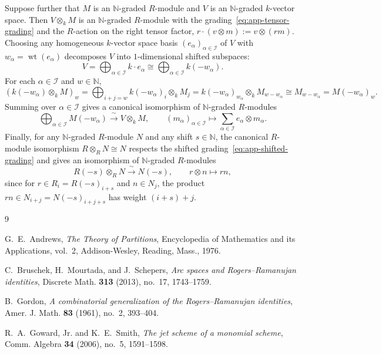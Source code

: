 \documentclass[a4paper, 12pt]{amsart}
\theoremstyle{remark}
\begin{document}
Suppose further that $M$ is an $\mathbb{N}$-graded $R$-module and $V$ is an $\mathbb{N}$-graded $k$-vector space.
Then $V \otimes_k M$ is an $\mathbb{N}$-graded $R$-module with the grading~\eqref{eq:app-tensor-grading} and the $R$-action on the right tensor factor,
$r \cdot (v \otimes m) := v \otimes (r m)$.
Choosing any homogeneous $k$-vector space basis $(e_\alpha)_{\alpha \in \mathcal{I}}$ of $V$ with $w_\alpha = \operatorname{wt}(e_\alpha)$ decomposes $V$ into $1$-dimensional shifted subspaces:
\begin{equation*}
  V = \bigoplus_{\alpha \in \mathcal{I}} k \cdot e_\alpha \cong \bigoplus_{\alpha \in \mathcal{I}} k(-w_\alpha).
\end{equation*}
For each $\alpha \in \mathcal{I}$ and $w \in \mathbb{N}$,
\begin{equation*}
  \left(k(-w_\alpha) \otimes_k M\right)_w
  = \bigoplus_{i + j = w} k(-w_\alpha)_i \otimes_k M_j
  = k(-w_\alpha)_{w_\alpha} \otimes_k M_{w - w_\alpha}
  \cong M_{w - w_\alpha}
  = M(-w_\alpha)_w.
\end{equation*}
Summing over $\alpha \in \mathcal{I}$ gives a canonical isomorphism of $\mathbb{N}$-graded $R$-modules
\begin{equation}
  \label{eq:app-shifted-sum-tensor}
  \bigoplus_{\alpha \in \mathcal{I}} M(-w_\alpha) \xrightarrow{\;\sim\;} V \otimes_k M, \qquad
  (m_\alpha)_{\alpha \in \mathcal{I}} \longmapsto \sum_{\alpha \in \mathcal{I}} e_\alpha \otimes m_\alpha.
\end{equation}
Finally,
for any $\mathbb{N}$-graded $R$-module $N$ and any shift $s \in \mathbb{N}$,
the canonical $R$-module isomorphism $R \otimes_R N \cong N$ respects the shifted grading~\eqref{eq:app-shifted-grading} and gives an isomorphism of $\mathbb{N}$-graded $R$-modules
\begin{equation}
  \label{eq:app-shifted-base-change}
  R(-s) \otimes_R N \xrightarrow{\;\sim\;} N(-s), \qquad
  r \otimes n \longmapsto r n,
\end{equation}
since for $r \in R_i = R(-s)_{i + s}$ and $n \in N_j$,
the product $r n \in N_{i + j} = N(-s)_{i + j + s}$ has weight $(i + s) + j$.

\begin{thebibliography}{9}

G.~E.~Andrews,
\newblock \emph{The Theory of Partitions},
\newblock Encyclopedia of Mathematics and its Applications, vol.~2, Addison-Wesley, Reading, Mass., 1976.

C.~Bruschek, H.~Mourtada, and J.~Schepers,
\newblock \emph{Arc spaces and {R}ogers--{R}amanujan identities},
\newblock Discrete Math. \textbf{313} (2013), no.~17, 1743--1759.

B.~Gordon,
\newblock \emph{A combinatorial generalization of the {R}ogers--{R}amanujan identities},
\newblock Amer. J. Math. \textbf{83} (1961), no.~2, 393--404.

R.~A.~Goward, Jr. and K.~E.~Smith,
\newblock \emph{The jet scheme of a monomial scheme},
\newblock Comm. Algebra \textbf{34} (2006), no.~5, 1591--1598.

\end{thebibliography}

\printindex
\end{document}
